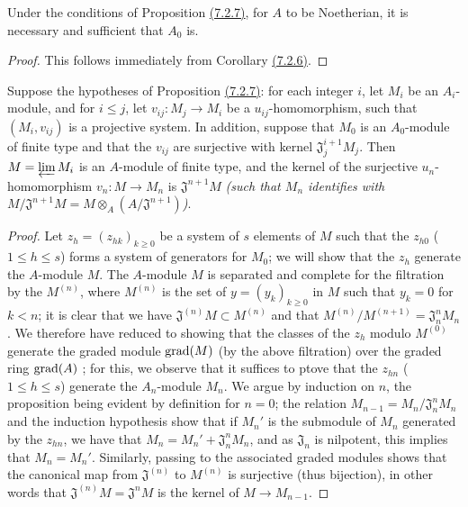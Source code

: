 \begin{cor}[7.2.8]
\label{cor-0.7.2.8}
Under the conditions of Proposition \hyperref[prop-0.7.2.7]{(7.2.7)}, for $A$ to
be Noetherian, it is necessary and sufficient that $A_0$ is.
\end{cor}

\begin{proof}
\label{proof-cor-0.7.2.8}
This follows immediately from Corollary \hyperref[cor-0.7.2.6]{(7.2.6)}.
\end{proof}

\begin{prop}[7.2.9]
\label{prop-0.7.2.9}
Suppose the hypotheses of Proposition \hyperref[prop-0.7.2.7]{(7.2.7)}: for each integer $i$,
let $M_i$ be an $A_i$-module, and for $i\leqslant j$, let $v_{ij}:M_j\to M_i$ be a
$u_{ij}$-homomorphism, such that $(M_i,v_{ij})$ is a projective system. In addition, suppose
that $M_0$ is an $A_0$-module of finite type and that the $v_{ij}$ are surjective with kernel
$\mathfrak{J}_j^{i+1}M_j$. Then $M=\varprojlim M_i$ is an $A$-module of finite type, and the
kernel of the surjective $u_n$-homomorphism $v_n:M\to M_n$ is $\mathfrak{J}^{n+1}M$
{\em (such that $M_n$ identifies with
$M/\mathfrak{J}^{n+1}M=M\otimes_A(A/\mathfrak{J}^{n+1})$)}.
\end{prop}

\begin{proof}
\label{proof-prop-0.7.2.9}
Let $z_h=(z_{hk})_{k\geqslant 0}$ be a system of $s$ elements of $M$ such that the $z_{h0}$
($1\leqslant h\leqslant s$) forms a system of generators for $M_0$; we will show that the
$z_h$ generate the $A$-module $M$. The $A$-module $M$ is separated and complete for the
filtration by the $M^{(n)}$, where $M^{(n)}$ is the set of $y=(y_k)_{k\geqslant 0}$ in $M$
such that $y_k=0$ for $k<n$; it is clear that we have $\mathfrak{J}^{(n)}M\subset M^{(n)}$
and that $M^{(n)}/M^{(n+1)}=\mathfrak{J}_n^n M_n$. We therefore have reduced to showing that
the classes of the $z_h$ modulo $M^{(0)}$ generate the graded module ${\mathop{\mathrm{grad}}\nolimits}(M)$ (by the
above filtration) over the graded ring ${\mathop{\mathrm{grad}}\nolimits}(A)$ \cite[p. 18--06, lemme]{I-1}; for this, we
observe that it suffices to ptove that the $z_{hn}$ ($1\leqslant h\leqslant s$) generate the
$A_n$-module $M_n$. We argue by induction on $n$, the proposition being evident by definition
for $n=0$; the relation $M_{n-1}=M_n/\mathfrak{J}_n^n M_n$ and the induction hypothesis show
that if $M_n'$ is the submodule of $M_n$ generated by the $z_{hn}$, we have that
$M_n=M_n'+\mathfrak{J}_n^n M_n$, and as $\mathfrak{J}_n$ is nilpotent, this implies that
$M_n=M_n'$. Similarly, passing to the associated graded modules shows that the canonical map
from $\mathfrak{J}^{(n)}$ to $M^{(n)}$ is surjective (thus bijection), in other words that
$\mathfrak{J}^{(n)}M=\mathfrak{J}^n M$ is the kernel of $M\to M_{n-1}$.
\end{proof}

